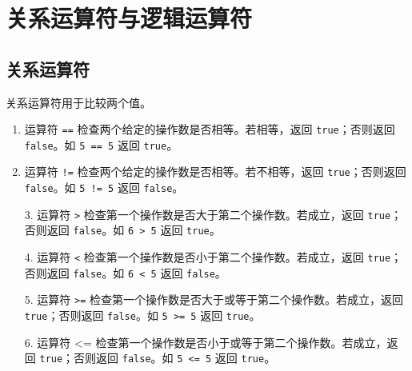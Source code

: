 \section{关系运算符与逻辑运算符}

\subsection{关系运算符}

\begin{frame}\ft{\subsecname}
关系运算符用于比较两个值。
\begin{enumerate}
\item
  运算符  \lstinline|==|  检查两个给定的操作数是否相等。若相等，返回 \lstinline|true|；否则返回 \lstinline|false|。如  \lstinline|5 == 5| 返回 \lstinline|true|。
\item
  运算符  \lstinline|!=|  检查两个给定的操作数是否相等。若不相等，返回 \lstinline|true|；否则返回 \lstinline|false|。如  \lstinline|5 != 5| 返回 \lstinline|false|。
\end{enumerate}
\end{frame}

\begin{frame}\ft{\subsecname}
  \begin{enumerate}
\item[3.]
  运算符  \lstinline|>| 检查第一个操作数是否大于第二个操作数。若成立，返回 \lstinline|true|；否则返回 \lstinline|false|。如  \lstinline|6 > 5| 返回 \lstinline|true|。
\item[4.]
  运算符  \lstinline|<| 检查第一个操作数是否小于第二个操作数。若成立，返回 \lstinline|true|；否则返回 \lstinline|false|。如  \lstinline|6 < 5| 返回 \lstinline|false|。
\end{enumerate}
\end{frame}

\begin{frame}\ft{\subsecname}
  \begin{enumerate}
\item[5.]
  运算符  \lstinline|>=| 检查第一个操作数是否大于或等于第二个操作数。若成立，返回 \lstinline|true|；否则返回 \lstinline|false|。如  \lstinline|5 >= 5| 返回 \lstinline|true|。
\item[6.]
  运算符 {\tf <=} 检查第一个操作数是否小于或等于第二个操作数。若成立，返回 \lstinline|true|；否则返回 \lstinline|false|。如  \lstinline|5 <= 5| 返回 \lstinline|true|。
\end{enumerate}
  
\end{frame}

